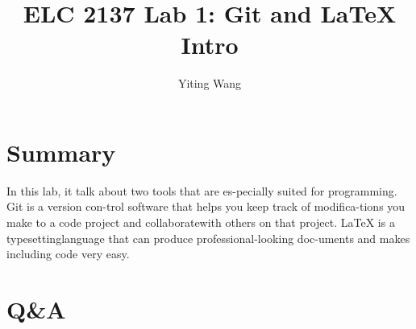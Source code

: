 \documentclass[11pt]{article}
\begin{document}
\title{ELC 2137 Lab 1: Git and LaTeX Intro}
\author{Yiting Wang}

\maketitle


\section*{Summary}

In this lab, it talk about two tools that are es-pecially suited for programming.  Git is a version con-trol software that helps you keep track of modifica-tions you make to a code project and collaboratewith others on that project.  LaTeX is a typesettinglanguage that can produce professional-looking doc-uments and makes including code very easy.


\section*{Q\&A}
\end{document}
